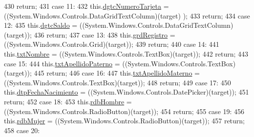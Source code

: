 \begin{DoxyCode}
430             \textcolor{keywordflow}{return};
431             \textcolor{keywordflow}{case} 11:
432             this.\hyperlink{class_proyecto___integrador__3_1_1_main_window_ab28b60d43c765aa3cf2dc7c64e56f8c7}{dgtcNumeroTarjeta} = ((System.Windows.Controls.DataGridTextColumn)(target)
      );
433             \textcolor{keywordflow}{return};
434             \textcolor{keywordflow}{case} 12:
435             this.\hyperlink{class_proyecto___integrador__3_1_1_main_window_a4ebf6bc961d2d0fab8efaa8e3ea2879c}{dgtcSaldo} = ((System.Windows.Controls.DataGridTextColumn)(target));
436             \textcolor{keywordflow}{return};
437             \textcolor{keywordflow}{case} 13:
438             this.\hyperlink{class_proyecto___integrador__3_1_1_main_window_a9386928aff943060071efe864b17ca03}{grdRegistro} = ((System.Windows.Controls.Grid)(target));
439             \textcolor{keywordflow}{return};
440             \textcolor{keywordflow}{case} 14:
441             this.\hyperlink{class_proyecto___integrador__3_1_1_main_window_a66650387b40eb348806d9692d163e03a}{txtNombre} = ((System.Windows.Controls.TextBox)(target));
442             \textcolor{keywordflow}{return};
443             \textcolor{keywordflow}{case} 15:
444             this.\hyperlink{class_proyecto___integrador__3_1_1_main_window_a84bcf28ad1df8514c1b1646ab9a62513}{txtApellidoPaterno} = ((System.Windows.Controls.TextBox)(target));
445             \textcolor{keywordflow}{return};
446             \textcolor{keywordflow}{case} 16:
447             this.\hyperlink{class_proyecto___integrador__3_1_1_main_window_ad6d2f2927d00f63954e85d4609c9c2b6}{txtApellidoMaterno} = ((System.Windows.Controls.TextBox)(target));
448             \textcolor{keywordflow}{return};
449             \textcolor{keywordflow}{case} 17:
450             this.\hyperlink{class_proyecto___integrador__3_1_1_main_window_a366d1c04863cd090fb2a941de8adbd3d}{dtpFechaNacimiento} = ((System.Windows.Controls.DatePicker)(target));
451             \textcolor{keywordflow}{return};
452             \textcolor{keywordflow}{case} 18:
453             this.\hyperlink{class_proyecto___integrador__3_1_1_main_window_a18bdb73ede87b12a96e18de224a8d780}{rdbHombre} = ((System.Windows.Controls.RadioButton)(target));
454             \textcolor{keywordflow}{return};
455             \textcolor{keywordflow}{case} 19:
456             this.\hyperlink{class_proyecto___integrador__3_1_1_main_window_ad63d95f7d01cf55567a764c385df5542}{rdbMujer} = ((System.Windows.Controls.RadioButton)(target));
457             \textcolor{keywordflow}{return};
458             \textcolor{keywordflow}{case} 20:

\end{DoxyCode}
